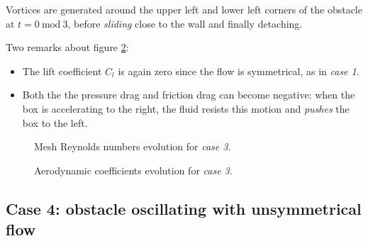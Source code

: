 \documentclass[11 pt]{article}
\begin{document}
Vortices are generated around the upper left and lower left corners of the obstacle at $t=0 \: \textrm{mod} \: 3$, before \textit{sliding} close to the wall and finally detaching.

Two remarks about figure \ref{fig:drag_case3}:
\begin{itemize}
    \item The lift coefficient $C_l$ is again zero since the flow is symmetrical, as in \textit{case 1}.
    \item Both the the pressure drag and friction drag can become negative: when the box is accelerating to the right, the fluid resists this motion and \textit{pushes} the box to the left.
\end{itemize}

\begin{figure}[H]
    \centering
    
    \caption{Mesh Reynolds numbers evolution for \textit{case 3}.}
    \label{fig:mesh_re_case3}
\end{figure}


\begin{figure}[H]
    \centering
    
    \caption{Aerodynamic coefficients evolution for \textit{case 3}.}
    \label{fig:drag_case3}
\end{figure}


\subsection{Case 4: obstacle oscillating with unsymmetrical flow}
\end{document}

